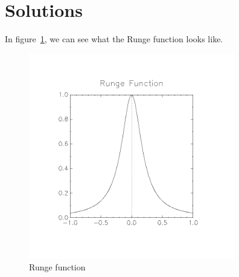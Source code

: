\documentclass[11pt, a4paper, titlepage, openright]{article}
\begin{document}
\section{Solutions}
    In figure~\ref{fig:runge}, we can see what the Runge function looks like.
    \begin{figure}[H]
        \centering
        \includegraphics[width=9cm, trim={2cm, 4cm, 2cm, 3cm}, clip]{../images/runge}
        \caption{Runge function}
        \label{fig:runge}
    \end{figure}
\end{document}
